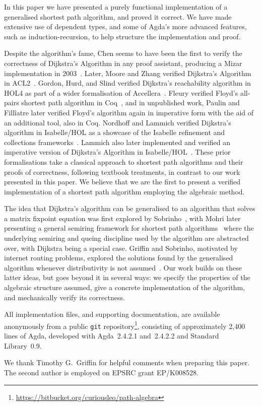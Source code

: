 In this paper we have presented a purely functional implementation of a generalised shortest path algorithm, and proved it correct.
We have made extensive use of dependent types, and some of Agda's more advanced features, such as induction-recursion, to help structure the implementation and proof.

Despite the algorithm's fame, Chen seems to have been the first to verify the correctness of Dijkstra's Algorithm in any proof assistant, producing a Mizar implementation in 2003~\cite{chen:dijkstra:2003}.
Later, Moore and Zhang verified Dijkstra's Algorithm in ACL2~\cite{moore:proof-pearl:2005}.
Gordon, Hurd, and Slind verified Dijkstra's reachability algorithm in HOL4 as part of a wider formalisation of Accellera~\cite{gordon:executing:2003}.
Fleury verified Floyd's all-pairs shortest path algorithm in Coq~\cite{fleury:implantation:1990}, and in unpublished work, Paulin and Fill\^iatre later verified Floyd's algorithm again in imperative form with the aid of an additional tool, also in Coq.
Nordhoff and Lammich verified Dijkstra's algorithm in Isabelle/HOL as a showcase of the Isabelle refinement and collections frameworks~\cite{nordhoff-dijkstra-2012}.
Lammich also later implemented and verified an imperative version of Dijkstra's Algorithm in Isabelle/HOL~\cite{lammich:refinement:2015}.
These prior formalisations take a classical approach to shortest path algorithms and their proofs of correctness, following textbook treatments, in contrast to our work presented in this paper.
We believe that we are the first to present a verified implementation of a shortest path algorithm employing the algebraic method.

The idea that Dijkstra's algorithm can be generalised to an algorithm that solves a matrix fixpoint equation was first explored by Sobrinho~\cite{sobrinho_algebra_2001}, with Mohri later presenting a general semiring framework for shortest path algorithms~\cite{mohri:semiring:2002} where the underlying semiring and queing discipline used by the algorithm are abstracted over, with Dijkstra being a special case.
Griffin and Sobrinho, motivated by internet routing problems, explored the solutions found by the generalised algorithm whenever distributivity is not assumed~\cite{sobrinho_routing_2010}.
Our work builds on these latter ideas, but goes beyond it in several ways: we specify the properties of the algebraic structure assumed, give a concrete implementation of the algorithm, and mechanically verify its correctness.

All implementation files, and supporting documentation, are available anonymously from a public \texttt{git} repository\footnote{\url{https://bitbucket.org/curiousleo/path-algebra}}, consisting of approximately 2,400 lines of Agda, developed with Agda~2.4.2.1 and~2.4.2.2 and Standard Library~0.9.

We thank Timothy G.~Griffin for helpful comments when preparing this paper.
The second author is employed on EPSRC grant EP/K008528.
